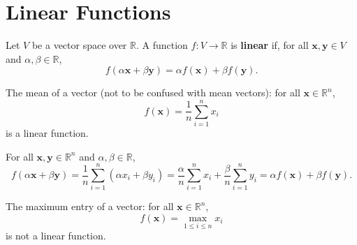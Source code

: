 \documentclass{huhtakm-template-book-v2}
\begin{document}
\section{Linear Functions}
    \begin{defn}
        Let $V$ be a vector space over $\mathbb{R}$. A function $f:V\to\mathbb{R}$ is \textbf{linear} if, for all $\mathbf{x},\mathbf{y}\in V$ and $\alpha,\beta\in\mathbb{R}$,
        \begin{equation*}
            f(\alpha\mathbf{x}+\beta\mathbf{y})=\alpha f(\mathbf{x})+\beta f(\mathbf{y}).
        \end{equation*}
    \end{defn}
    \begin{eg}
        The mean of a vector (not to be confused with mean vectors): for all $\mathbf{x}\in\mathbb{R}^{n}$,
        \begin{equation*}
            f(\mathbf{x})=\frac{1}{n}\sum_{i=1}^{n}x_{i}
        \end{equation*}
        is a linear function.
    \end{eg}
    \begin{proofing}
        For all $\mathbf{x},\mathbf{y}\in\mathbb{R}^{n}$ and $\alpha,\beta\in\mathbb{R}$,
        \begin{equation*}
            f(\alpha\mathbf{x}+\beta\mathbf{y})=\frac{1}{n}\sum_{i=1}^{n}(\alpha x_{i}+\beta y_{i})=\frac{\alpha}{n}\sum_{i=1}^{n}x_{i}+\frac{\beta}{n}\sum_{i=1}^{n}y_{i}=\alpha f(\mathbf{x})+\beta f(\mathbf{y}).
        \end{equation*}
    \end{proofing}
    \begin{eg}
        The maximum entry of a vector: for all $\mathbf{x}\in\mathbb{R}^{n}$,
        \begin{equation*}
            f(\mathbf{x})=\max_{1\leq i\leq n}x_{i}
        \end{equation*}
        is not a linear function.
    \end{eg}
\end{document}
